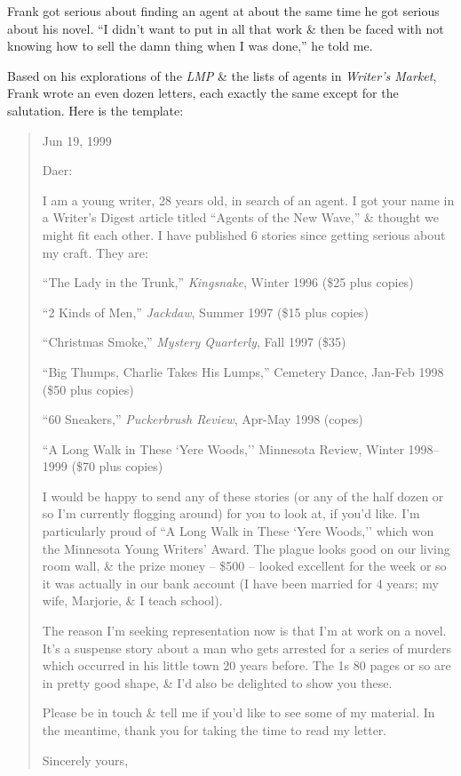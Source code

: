\documentclass{article}
\numberwithin{equation}{section}
\begin{document}
Frank got serious about finding an agent at about the same time he got serious about his novel. ``I didn't want to put in all that work \& then be faced with not knowing how to sell the damn thing when I was done,'' he told me.

Based on his explorations of the \textit{LMP} \& the lists of agents in \textit{Writer's Market}, Frank wrote an even dozen letters, each exactly the same except for the salutation. Here is the template:
\begin{quotation}
	\begin{flushright}
		Jun 19, 1999
	\end{flushright}
	Daer:
	
	I am a young writer, 28 years old, in search of an agent. I got your name in a Writer's Digest article titled ``Agents of the New Wave,'' \& thought we might fit each other. I have published 6 stories since getting serious about my craft. They are:
	
	``The Lady in the Trunk,'' \textit{Kingsnake}, Winter 1996 (\$25 plus copies)
	
	``2 Kinds of Men,'' \textit{Jackdaw}, Summer 1997 (\$15 plus copies)
	
	``Christmas Smoke,'' \textit{Mystery Quarterly}, Fall 1997 (\$35)
	
	``Big Thumps, Charlie Takes His Lumps,'' Cemetery Dance, Jan-Feb 1998 (\$50 plus copies)
	
	``60 Sneakers,'' \textit{Puckerbrush Review}, Apr-May 1998 (copes)
	
	``A Long Walk in These `Yere Woods,'' Minnesota Review, Winter 1998--1999 (\$70 plus copies)
	
	I would be happy to send any of these stories (or any of the half dozen or so I'm currently flogging around) for you to look at, if you'd like. I'm particularly proud of ``A Long Walk in These `Yere Woods,'' which won the Minnesota Young Writers' Award. The plague looks good on our living room wall, \& the prize money -- \$500 -- looked excellent for the week or so it was actually in our bank account (I have been married for 4 years; my wife, Marjorie, \& I teach school).
	
	The reason I'm seeking representation now is that I'm at work on a novel. It's a suspense story about a man who gets arrested for a series of murders which occurred in his little town 20 years before. The 1s 80 pages or so are in pretty good shape, \& I'd also be delighted to show you these.
	
	Please be in touch \& tell me if you'd like to see some of my material. In the meantime, thank you for taking the time to read my letter.
	\begin{flushright}
		Sincerely yours,
	\end{flushright}
\end{quotation}
\end{document}
